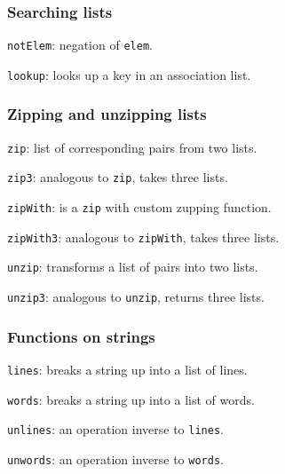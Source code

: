 \documentclass[a4paper, twoside, 8pt]{extarticle}
\begin{document}
\begin{multicols*}{3}
\subsubsection{Searching lists}
\texttt{notElem}: negation of \texttt{elem}.

\texttt{lookup}: looks up a key in an association list.

\subsubsection{Zipping and unzipping lists}
\texttt{zip}: list of corresponding pairs from two lists.

\texttt{zip3}: analogous to \texttt{zip}, takes three lists.

\texttt{zipWith}: is a  \texttt{zip} with custom zupping function.

\texttt{zipWith3}: analogous to \texttt{zipWith}, takes three lists.

\texttt{unzip}: transforms a list of pairs into two lists.

\texttt{unzip3}: analogous to \texttt{unzip}, returns three lists.

\subsubsection{Functions on strings}
\texttt{lines}: breaks a string up into a list of lines.

\texttt{words}: breaks a string up into a list of words.

\texttt{unlines}: an operation inverse to \texttt{lines}.
 
\texttt{unwords}: an operation inverse to \texttt{words}.

\end{multicols*}
\end{document}
